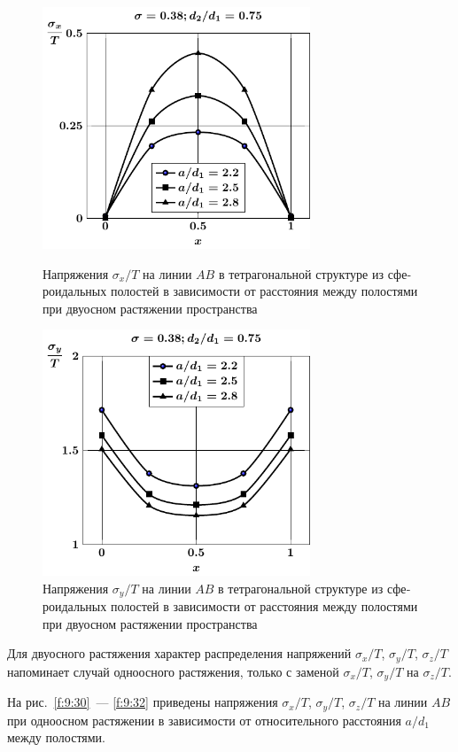 \begin{russian}
\begin{figure}[h!]
\centering\footnotesize
\parbox[b]{7.5cm}{\centering\includegraphics[width=8cm]{cav8-a-d75-t2-sig_x-ab.pdf}
\caption{Напряжения $\sigma_x/T$ на линии $AB$ в тетрагональной структуре из сфероидальных полостей в зависимости от расстояния между полостями при двуосном растяжении пространства
\label{f:9:33}}}\hfil\hfil
\parbox[b]{7.5cm}{\centering\includegraphics[width=8cm]{cav8-a-d75-t2-sig_y-ab.pdf}
\caption{Напряжения $\sigma_y/T$ на линии $AB$ в тетрагональной структуре из сфероидальных полостей в зависимости от расстояния между полостями при двуосном растяжении пространства
\label{f:9:34}}}
\end{figure}

Для двуосного растяжения характер распределения напряжений $\sigma_x/T$, $\sigma_y/T$, $\sigma_z/T$ напоминает случай одноосного растяжения, только с заменой $\sigma_x/T$, $\sigma_y/T$ на $\sigma_z/T$.

На рис.~\ref{f:9:30}~--- \ref{f:9:32} приведены напряжения $\sigma_x/T$, $\sigma_y/T$, $\sigma_z/T$ на линии $AB$ при одноосном растяжении в зависимости от относительного расстояния $a/d_1$ между полостями.


\end{russian}
